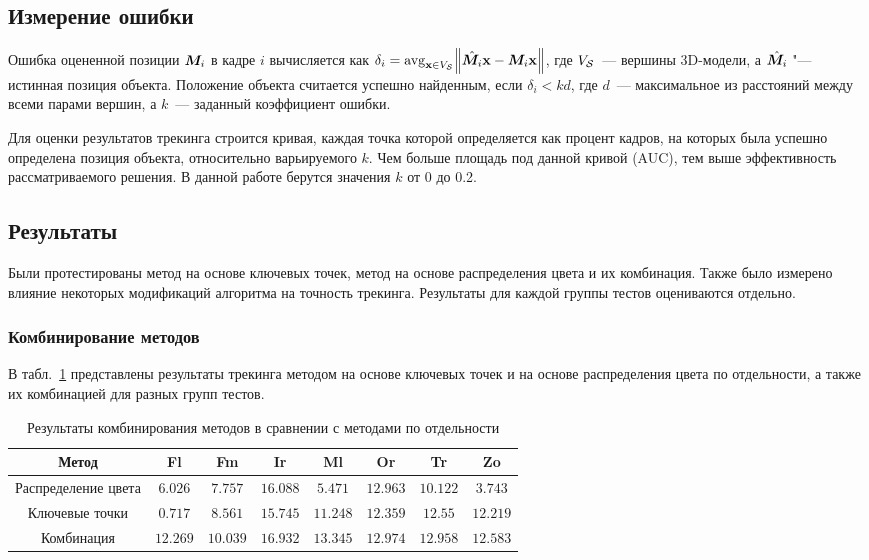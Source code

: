 \subsection{Измерение ошибки}

Ошибка оцененной позиции $\bm{M}_i$ в кадре $i$ вычисляется как
$
\delta_i = \operatorname*{avg}_{\mathbf{x} \in V_{\mathcal{S}}} \norm{\hat{\bm{M}_i} \mathbf{x} - \bm{M}_i
\mathbf{x}}
$,
где $V_{\mathcal{S}}$~--- вершины 3D-модели,
а $\hat{\bm{M}_i}$ "--- истинная позиция объекта.
Положение объекта считается успешно найденным, если $\delta_i < k d$, где
$d$~--- максимальное из расстояний между всеми парами вершин, а $k$~---
заданный коэффициент ошибки.

Для оценки результатов трекинга строится кривая, каждая точка которой
определяется как процент кадров, на которых была успешно определена позиция
объекта, относительно варьируемого $k$.
Чем больше площадь под данной кривой (AUC), тем выше эффективность
рассматриваемого решения.
В данной работе берутся значения $k$ от 0 до 0.2.

\subsection{Результаты}
Были протестированы метод на основе ключевых точек, метод на основе
распределения цвета и их комбинация.
Также было измерено влияние некоторых модификаций алгоритма на
точность трекинга.
Результаты для каждой группы тестов оцениваются отдельно.

\subsubsection{Комбинирование методов}

В табл.~\ref{tab:combine} представлены результаты трекинга методом на основе
ключевых точек и на основе распределения цвета по отдельности, а также их
комбинацией для разных групп тестов.

\begin{table}[h]
\caption{\label{tab:combine}Результаты комбинирования методов в сравнении с
методами по отдельности}
\begin{center}
\begin{tabular}{|c|c|c|c|c|c|c|c|}
\hline
Метод & Fl & Fm & Ir & Ml & Or & Tr & Zo \\
\hline
Распределение цвета & $6.026$ & $7.757$ & $16.088$ & $5.471$ & $12.963$ &
$10.122$ & $3.743$ \\
\hline
Ключевые точки & $0.717$ & $8.561$ & $15.745$ & $11.248$ & $12.359$ & $12.55$
&$12.219$ \\
\hline
Комбинация & $12.269$ & $10.039$ & $16.932$ & $13.345$ & $12.974$ & $12.958$ &
$12.583$ \\
\hline
\end{tabular}
\end{center}
\end{table}

